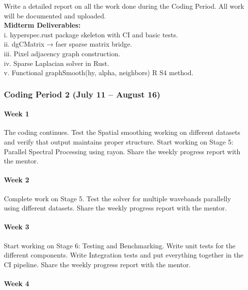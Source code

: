 \documentclass[11pt]{article}
\begin{document}
Write a detailed report on all the work done during the Coding Period.
All work will be documented and uploaded.\\
\textbf{Midterm Deliverables:}\\
i. hyperspec.rust package skeleton with CI and basic tests.\\
ii. dgCMatrix → faer sparse matrix bridge.\\
iii. Pixel adjacency graph construction.\\
iv. Sparse Laplacian solver in Rust.\\
v. Functional graphSmooth(hy, alpha, neighbors) R S4 method.

\hypertarget{coding-period-2-july-11-august-16}{%
\subsubsection{Coding Period 2 (July 11 -- August
16)}\label{coding-period-2-july-11-august-16}}

\hypertarget{week-1-3}{%
\paragraph{Week 1}\label{week-1-3}}

\hfill\break
The coding continues. Test the Spatial smoothing working on different
datasets and verify that output maintains proper structure. Start
working on Stage 5: Parallel Spectral Processing using rayon. Share the
weekly progress report with the mentor.

\hypertarget{week-2-3}{%
\paragraph{Week 2}\label{week-2-3}}

\hfill\break
Complete work on Stage 5. Test the solver for multiple wavebands
parallelly using different datasets. Share the weekly progress report
with the mentor.

\hypertarget{week-3-3}{%
\paragraph{Week 3}\label{week-3-3}}

\hfill\break
Start working on Stage 6: Testing and Benchmarking. Write unit tests for
the different components. Write Integration tests and put everything
together in the CI pipeline. Share the weekly progress report with the
mentor.

\hypertarget{week-4-3}{%
\paragraph{Week 4}\label{week-4-3}}
\end{document}
